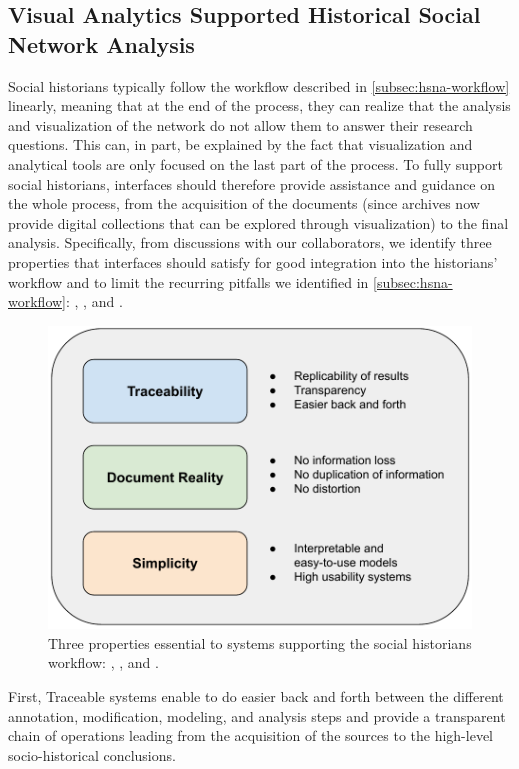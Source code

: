 \subsection{Visual Analytics Supported Historical Social Network Analysis}\label{subsec:hsna-properties}

Social historians typically follow the workflow described in \autoref{subsec:hsna-workflow} linearly, meaning that at the end of the process, they can realize that the analysis and visualization of the network do not allow them to answer their research questions\cite{lemercier12FormalNetwork2015}.
This can, in part, be explained by the fact that visualization and analytical \sna tools are only focused on the last part of the process.
To fully support social historians, \va interfaces should therefore provide assistance and guidance on the whole process, from the acquisition of the documents (since archives now provide digital collections that can be explored through visualization\cite{forliniMiningMaterialArchive2018, thudtBohemianBookshelfSupporting2012}) to the final analysis.
Specifically, from discussions with our collaborators, we identify three properties that \va interfaces should satisfy for good integration into the historians' workflow and to limit the recurring pitfalls we identified in \autoref{subsec:hsna-workflow}: \traceability, \reality, and \simplicity.
\begin{figure}[!ht]
    \centering
    \includegraphics[width=0.70\linewidth]{static/figures/HSNAProcess/properties}
    \caption{Three properties essential to \va systems supporting the social historians workflow: \traceability, \reality, and \simplicity.}\label{fig:HSNA-properties}
\end{figure}
First, Traceable systems enable to do easier back and forth between the different annotation, modification, modeling, and analysis steps and provide a transparent chain of operations leading from the acquisition of the sources to the high-level socio-historical conclusions.

